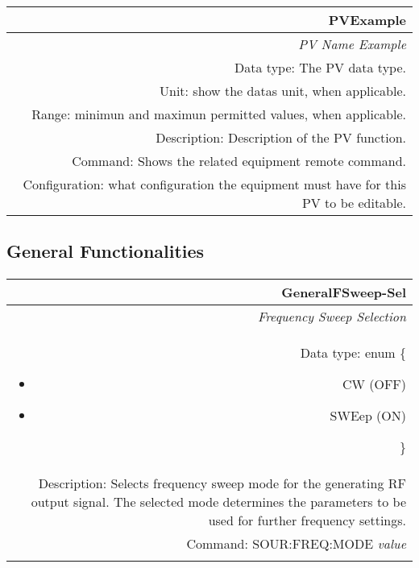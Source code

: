 \documentclass[openany]{article}
\begin{document}
		\newcommand{\FuncTableBorderColor}{gray!50} %
		\newcommand{\nofunc}{\cellcolor{gray!20}\color{gray}} %
		\newcommand{\yesfunc}{\cellcolor{white}\color{black}} %

		\bigskip
		\begin{tabular}{N}
			\hline
			\bfseries PVExample \\ \hline
			\emph{PV Name Example} \\
			Data type: The PV data type. \\
			Unit: show the datas unit, when applicable. \\
			Range: minimun and maximun permitted values, when applicable. \\
			Description: Description of the PV function. \\
			Command: Shows the related equipment remote command. \\
			Configuration: what configuration the equipment must have for this PV to be editable. \\

		\end{tabular}


	\subsection{General Functionalities}\label{pvgroup:function}
		

		\paragraph{} %


		\begin{tabular}{N}
			\hline
			\bfseries GeneralFSweep-Sel \\ \hline
			\emph{Frequency Sweep Selection} \\
			Data type: enum \{\begin{itemize}[noitemsep]
				\small
				\item[] CW (OFF)
				\item[] SWEep (ON)
			\end{itemize}\} \\
			Description: Selects frequency sweep mode for the generating RF output signal. The selected mode determines the parameters to be used for further frequency settings. \\
			Command: SOUR:FREQ:MODE \emph{value} \\
			\\

		\end{tabular}
\end{document}
